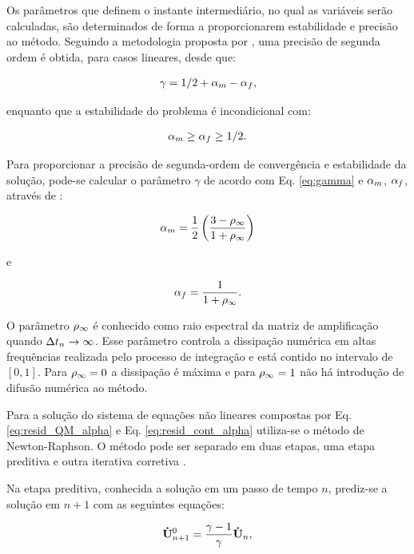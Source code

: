 \documentclass[tese_patricia]{subfiles}%
\begin{document}
Os parâmetros que definem o instante intermediário, no qual as variáveis serão calculadas, são determinados de forma a proporcionarem estabilidade e precisão ao método. Seguindo a metodologia proposta por , uma precisão de segunda ordem é obtida, para casos lineares, desde que: 

\begin{gather}
\gamma = 1/2 + \alpha_m - \alpha_f,\label{eq:gamma}
\end{gather}

\noindent enquanto que a estabilidade do problema é incondicional com:

\begin{gather}
\alpha_m \ge \alpha_f \ge 1/2.
\end{gather}

Para proporcionar a precisão de segunda-ordem de convergência e estabilidade da solução, pode-se calcular o parâmetro $\gamma$ de acordo com Eq. \ref {eq:gamma} e $\alpha_m$, $\alpha_f$, através de \cite{Hughes:2000}:


\begin{gather}
\alpha_m = \frac{1}{2}\left(\frac{3 - \rho_\infty}{1+\rho_\infty}\right)\label{eq:alpha_m}\\
\end{gather}

\noindent e

\begin{gather}
\alpha_f = \frac{1}{1+\rho_\infty}\label{eq:alpha_f}.
\end{gather}

O parâmetro $\rho_\infty$ é conhecido como raio espectral da matriz de amplificação quando $\Delta t_{n} \rightarrow \infty$. Esse parâmetro controla a dissipação numérica em altas frequências realizada pelo processo de integração e está contido no intervalo de $[0,1]$. Para $\rho_\infty = 0$ a dissipação é máxima e para $\rho_\infty = 1$ não há introdução de difusão numérica ao método.

Para a solução do sistema de equações não lineares compostas por Eq. \eqref{eq:resid_QM_alpha} e Eq. \eqref{eq:resid_cont_alpha} utiliza-se o método de Newton-Raphson. O método pode ser separado em duas etapas, uma etapa preditiva e outra iterativa corretiva \cite{BazilevsTT:2013}.

Na etapa preditiva, conhecida a solução em um passo de tempo $n$, prediz-se a solução em $n+1$ com as seguintes equações:

\begin{align}
\mathbf{\dot{U}}_{n+1}^{0} = \frac{\gamma-1}{\gamma}\mathbf{\dot{U}}_{n} \label{eq:pred_acel},
\end{align}
\end{document}

